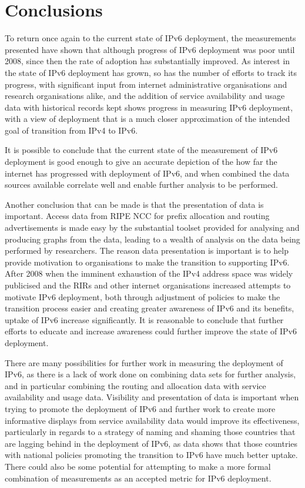 \section{Conclusions}

To return once again to the current state of IPv6 deployment, the measurements
presented have shown that although progress of IPv6 deployment was poor until
2008, since then the rate of adoption has substantially improved. As interest in
the state of IPv6 deployment has grown, so has the number of efforts to track
its progress, with significant input from internet administrative organisations
and research organisations alike, and the addition of service availability and
usage data with historical records kept shows progress in measuring IPv6
deployment, with a view of deployment that is a much closer 
approximation of the intended goal of transition from IPv4 to IPv6.

It is possible to conclude that the current state of the measurement of IPv6
deployment is good enough to give an accurate depiction of the how far the
internet has progressed with deployment of IPv6, and when combined the data
sources available correlate well and enable further analysis to be performed.

Another conclusion that can be made is that the presentation of data is
important. Access data from RIPE NCC for prefix allocation and routing
advertisements is made easy by the substantial toolset provided for analysing
and producing graphs from the data, leading to a wealth of analysis on the data
being performed by researchers. The reason data presentation is important is
to help provide motivation to organisations to make the transition to supporting
IPv6. After 2008 when the imminent exhaustion of the IPv4 address space was
widely publicised and the RIRs and other internet organisations increased
attempts to motivate IPv6 deployment, both through adjustment of policies to
make the transition process easier and creating greater awareness of IPv6 and
its benefits, uptake of IPv6 increase significantly. It is reasonable to
conclude that further efforts to educate and increase awareness could further
improve the state of IPv6 deployment.

There are many possibilities for further work in measuring the deployment of
IPv6, as there is a lack of work done on combining data sets for further
analysis, and in particular combining the routing and allocation data with
service availability and usage data. Visibility and presentation of data is
important when trying to promote the deployment of IPv6 and further work to
create more informative displays from service availability data would improve
its effectiveness, particularly in regards to a strategy of naming and shaming
those countries that are lagging behind in the deployment of IPv6, as data shows
that those countries with national policies promoting the transition to IPv6
have much better uptake\cite{olivier_mj_crepin-leblond_ipv6_2011}. There could also be some potential for
attempting to make a more formal combination of measurements as an accepted
metric for IPv6 deployment.

